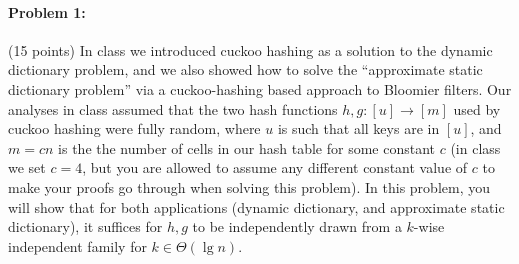 \documentclass[12pt]{article}
\begin{document}
\paragraph{Problem 1:} (15 points) In class we introduced cuckoo hashing as a solution to the dynamic dictionary problem, and we also showed how to solve the ``approximate static dictionary problem'' via a cuckoo-hashing based approach to Bloomier filters. Our analyses in class assumed that the two hash functions $h,g:[u]\rightarrow[m]$ used by cuckoo hashing were fully random, where $u$ is such that all keys are in $[u]$, and $m = cn$ is the the number of cells in our hash table for some constant $c$ (in class we set $c=4$, but you are allowed to assume any different constant value of $c$ to make your proofs go through when solving this problem). In this problem, you will show that for both applications (dynamic dictionary, and approximate static dictionary), it suffices for $h,g$ to be independently drawn from a $k$-wise independent family for $k \in \Theta(\lg n)$.
\end{document}
